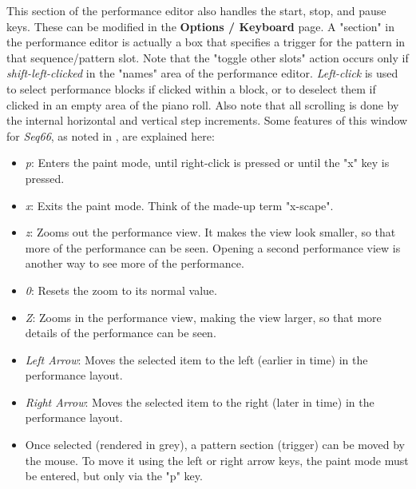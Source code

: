    This section of the performance editor also handles the start, stop, and
   pause keys.  These can be modified in the \textbf{Options / Keyboard} page.
   A "section" in the performance editor is actually a box that
   specifies a trigger for the pattern in that sequence/pattern slot.
   Note that the "toggle other slots" action occurs only if
   \textsl{shift-left-clicked}
   in the "names" area of the performance editor.
   \textsl{Left-click} is used to select performance blocks if clicked within
   a block, or to deselect them if clicked in an empty area of the piano roll.
   Also note that all scrolling is done by the internal horizontal and vertical
   step increments.
   Some features of this window for \textsl{Seq66},
   as noted in , are explained here:

   \begin{itemize}
      \item \textsl{p}:  Enters the paint mode, until right-click is pressed or
         until the "x" key is pressed.
      \item \textsl{x}:  Exits the paint mode.  Think of the made-up term
         "x-scape".
      \item \textsl{z}:  Zooms out the performance view.  It makes the view
         look smaller, so that more of the performance can be seen.
         Opening a second performance view is another way to see more
         of the performance.
      \item \textsl{0}:  Resets the zoom to its normal value.
      \item \textsl{Z}:  Zooms in the performance view, making the view
         larger, so that more details of the performance can be seen.
      \item \textsl{Left Arrow}:  Moves the selected item to the left (earlier
         in time) in the performance layout.
      \item \textsl{Right Arrow}:  Moves the selected item to the right (later
         in time) in the performance layout.
      \item Once selected (rendered in grey), a pattern section (trigger)
         can be moved by the mouse.
         To move it using the left or right
         arrow keys, the paint mode must be entered, but only via the "p"
         key.
   \end{itemize}

